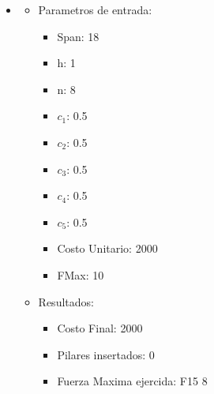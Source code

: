\begin{itemize}
\begin{itemize}
\begin{itemize}
	  \end{itemize}
      \end{itemize}
\item
  \begin{itemize}
    \item Parametros de entrada:
	  \begin{itemize}
	    \item Span: 18
	    \item h: 1
	    \item n: 8
	    \item $c_1$: 0.5
	    \item $c_2$: 0.5
	    \item $c_3$: 0.5
	    \item $c_4$: 0.5
	    \item $c_5$: 0.5
	    \item Costo Unitario: 2000
	    \item FMax: 10
	  \end{itemize}
      \item Resultados:
	  \begin{itemize}
	    \item Costo Final: 2000
	    \item Pilares insertados: 0
	    \item Fuerza Maxima ejercida: F15 8
	  \end{itemize}
      \end{itemize}


\end{itemize}

